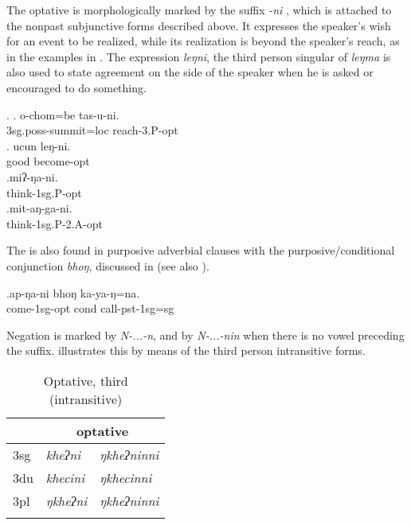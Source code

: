 The optative is morphologically marked by the suffix \emph{-ni} , which is attached to  the nonpast subjunctive forms described above. It expresses the speaker's wish for an event  to be realized, while its realization is beyond the speaker's reach, as in the examples in \Next. The expression \emph{leŋni}, the third person singular  of \emph{leŋma}  is also used to state agreement on the side of the speaker when he is asked or encouraged to do something.
 
\ex. \ag. o-chom=be tas-u-ni.\\
		{\sc 3sg.poss-}summit{\sc =loc} reach{\sc -3.P-opt}	\\
	 \bg. ucun leŋ-ni.\\ 
		good become{\sc [3sg]-opt}	\\
	 \bg.miʔ-ŋa-ni.\\
  think{\sc -1sg.P-opt}\\
   \bg.mit-aŋ-ga-ni.\\
  think{\sc -1sg.P-2.A-opt}\\
  
The  is also found in purposive adverbial clauses with the purposive/con\-di\-tion\-al conjunction \emph{bhoŋ}, discussed in  (see also \Next). 

\exg.ap-ŋa-ni bhoŋ ka-ya-ŋ=na.\\
come{\sc -1sg-opt} {\sc cond} call{\sc -pst-1sg=sg}\\

Negation is marked by \emph{N-...-n}, and by \emph{N-...-nin} when there is no vowel preceding the suffix.  illustrates this by means of the third person intransitive forms.

\begin{table}[htp]
\begin{center}
\begin{tabular}{lll}
\lsptoprule
&\multicolumn{2}{c}{{\sc optative}}\\
\midrule
		{\sc 3sg} & \it kheʔni& \it ŋkheʔninni\\
 		{\sc 3du} & \it khecini& \it ŋkhecinni\\
		{\sc 3pl} & \it ŋkheʔni& \it ŋkheʔninni\\
\lspbottomrule	
\end{tabular}
\end{center}
\caption{Optative, third  (intransitive)}\label{par-opt-intr}
\end{table}


